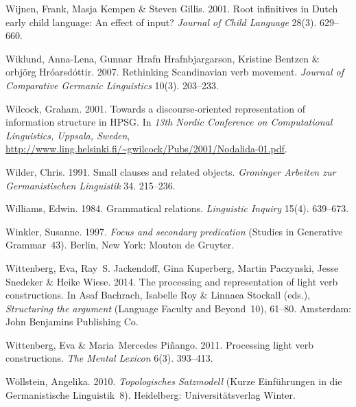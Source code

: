 \begin{thebibliography}{1420}
Wijnen, Frank, Masja Kempen \& Steven Gillis. 2001.
\newblock Root infinitives in {Dutch} early child language: {An} effect of
  input?
\newblock \emph{Journal of Child Language} 28(3). 629--660.

Wiklund, Anna-Lena, Gunnar~Hrafn Hrafnbjargarson, Kristine Bentzen \&
  {\TH}orbj{\"o}rg Hr{\'o}arsd{\'o}ttir. 2007.
\newblock Rethinking {Scandinavian} verb movement.
\newblock \emph{Journal of Comparative Germanic Linguistics} 10(3). 203--233.

Wilcock, Graham. 2001.
\newblock Towards a discourse-oriented representation of information structure
  in {HPSG}.
\newblock In \emph{{13th Nordic Conference on Computational Linguistics,
  Uppsala, Sweden}},
  \urlprefix\url{http://www.ling.helsinki.fi/~gwilcock/Pubs/2001/Nodalida-01.pdf}.

Wilder, Chris. 1991.
\newblock Small clauses and related objects.
\newblock \emph{Groninger Arbeiten zur Germanistischen Linguistik} 34.
  215--236.

Williams, Edwin. 1984.
\newblock Grammatical relations.
\newblock \emph{Linguistic Inquiry} 15(4). 639--673.

Winkler, Susanne. 1997.
\newblock \emph{Focus and secondary predication} (Studies in Generative
  Grammar~43).
\newblock Berlin, New York: Mouton de Gruyter.

Wittenberg, Eva, Ray~S. Jackendoff, Gina Kuperberg, Martin Paczynski, Jesse
  Snedeker \& Heike Wiese. 2014.
\newblock The processing and representation of light verb constructions.
\newblock In Asaf Bachrach, Isabelle Roy \& Linnaea Stockall (eds.),
  \emph{Structuring the argument} (Language Faculty and Beyond~10), 61--80.
  Amsterdam: John Benjamins Publishing Co.

Wittenberg, Eva \& Maria~Mercedes Pi{\~n}ango. 2011.
\newblock Processing light verb constructions.
\newblock \emph{The Mental Lexicon} 6(3). 393--413.

W{\"o}llstein, Angelika. 2010.
\newblock \emph{{Topologisches Satzmodell}} (Kurze Einf{\"u}hrungen in die
  Germanistische Linguistik~8).
\newblock Heidelberg: Universit{\"a}tsverlag Winter.


\end{thebibliography}
